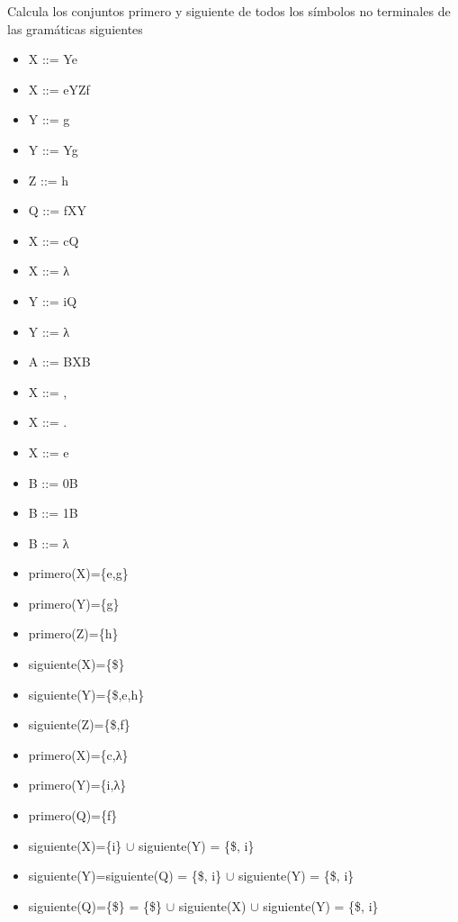 \documentclass[nochap]{apuntes}
\begin{document}
\begin{problem}
Calcula los conjuntos primero y siguiente de todos los símbolos no terminales de las gramáticas siguientes

\ppart
\begin{itemize}
\item X ::= Ye
\item X ::= eYZf
\item Y ::= g
\item Y ::= Yg
\item Z ::= h
\end{itemize}

\ppart
\begin{itemize}
\item Q ::= fXY
\item X ::= cQ
\item X ::= λ
\item Y ::= iQ
\item Y ::= λ
\end{itemize}

\ppart
\begin{itemize}
\item A ::= BXB
\item X ::= ,
\item X ::= .
\item X ::= e
\item B ::= 0B
\item B ::= 1B
\item B ::= λ
\end{itemize}

\solution
\spart
\begin{itemize}
\item primero(X)=\{e,g\}
\item primero(Y)=\{g\}
\item primero(Z)=\{h\}
\end{itemize}
\begin{itemize}
\item siguiente(X)=\{\$\}
\item siguiente(Y)=\{\$,e,h\}
\item siguiente(Z)=\{\$,f\}
\end{itemize}

\newpage

\spart
\begin{itemize}
\item primero(X)=\{c,λ\}
\item primero(Y)=\{i,λ\}
\item primero(Q)=\{f\}
\end{itemize}
\begin{itemize}
\item siguiente(X)=\{i\} $\cup$ siguiente(Y) = \{\$, i\}
\item siguiente(Y)=siguiente(Q) = \{\$, i\} $\cup$ siguiente(Y) = \{\$, i\}
\item siguiente(Q)=\{\$\} = \{\$\} $\cup$ siguiente(X) $\cup$ siguiente(Y) = \{\$, i\}
\end{itemize}


\end{problem}
\end{document}
